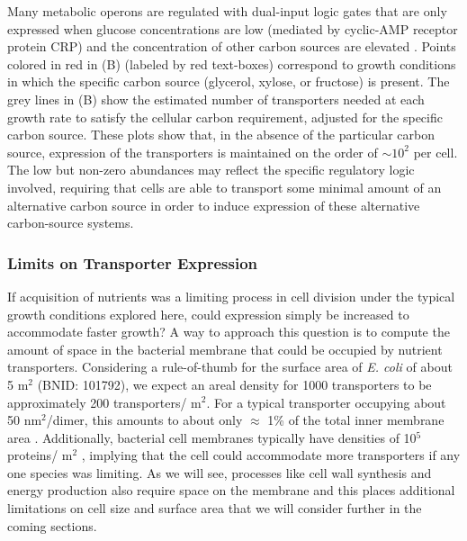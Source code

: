 Many metabolic operons are regulated with dual-input logic gates that are
only expressed when glucose concentrations are low (mediated by cyclic-AMP
receptor protein CRP) and the concentration of other carbon sources are
elevated \citep{gama-castro2016, zhang2014a, gama-castro2016, belliveau2018,
ireland2020}. Points colored in red in (B) (labeled by red
text-boxes) correspond to growth conditions in which the specific carbon
source (glycerol, xylose, or fructose) is present. The grey lines in
(B) show the estimated number of transporters needed at
each growth rate to satisfy the cellular carbon requirement, adjusted for the
specific carbon source. These plots show that, in the absence of the
particular carbon source, expression of the transporters is maintained on the
order of $\sim 10^2$ per cell. The low but non-zero abundances may reflect
the specific regulatory logic involved, requiring that cells are able to
transport some minimal amount of an alternative carbon source in order to
induce expression of these alternative carbon-source systems.

\subsubsection{Limits on Transporter Expression}
If acquisition of nutrients was a limiting process in cell division under the
typical growth conditions explored here, could expression simply be increased to
accommodate faster growth? A way to approach this question is to compute the
amount of space in the bacterial membrane that could be occupied by nutrient
transporters. Considering a rule-of-thumb for the surface area of \textit{E.
coli} of about 5 \textmu m$^2$ (BNID: 101792), we expect an areal density for
1000 transporters to be approximately 200 transporters/ \textmu m$^2$. For a
typical transporter occupying about 50 nm$^2$/dimer, this amounts to about only
$\approx$ 1\% of the total inner membrane area \citep{szenk2017}. Additionally,
bacterial cell membranes typically have densities of 10$^5$ proteins/\textmu
m$^2$ \citep{phillips2018}, implying that the cell could accommodate more
transporters if any one species was limiting. As we will see, processes
like cell wall synthesis and energy production also require space on the
membrane and this places additional limitations on cell size and surface area
that we will consider further in the coming sections.
